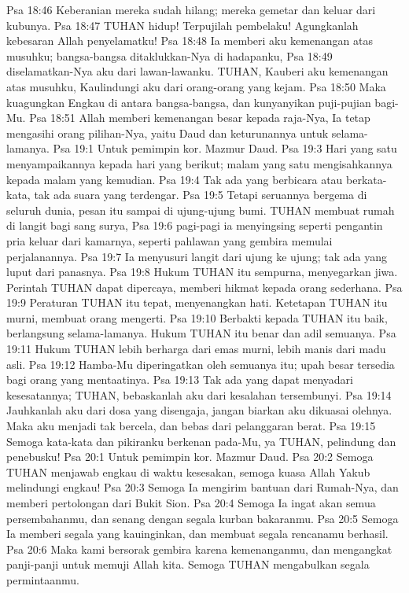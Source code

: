 Psa 18:46  Keberanian mereka sudah hilang; mereka gemetar dan keluar dari kubunya.
Psa 18:47  TUHAN hidup! Terpujilah pembelaku! Agungkanlah kebesaran Allah penyelamatku!
Psa 18:48  Ia memberi aku kemenangan atas musuhku; bangsa-bangsa ditaklukkan-Nya di hadapanku,
Psa 18:49  diselamatkan-Nya aku dari lawan-lawanku. TUHAN, Kauberi aku kemenangan atas musuhku, Kaulindungi aku dari orang-orang yang kejam.
Psa 18:50  Maka kuagungkan Engkau di antara bangsa-bangsa, dan kunyanyikan puji-pujian bagi-Mu.
Psa 18:51  Allah memberi kemenangan besar kepada raja-Nya, Ia tetap mengasihi orang pilihan-Nya, yaitu Daud dan keturunannya untuk selama-lamanya.
Psa 19:1  Untuk pemimpin kor. Mazmur Daud.
Psa 19:3  Hari yang satu menyampaikannya kepada hari yang berikut; malam yang satu mengisahkannya kepada malam yang kemudian.
Psa 19:4  Tak ada yang berbicara atau berkata-kata, tak ada suara yang terdengar.
Psa 19:5  Tetapi seruannya bergema di seluruh dunia, pesan itu sampai di ujung-ujung bumi. TUHAN membuat rumah di langit bagi sang surya,
Psa 19:6  pagi-pagi ia menyingsing seperti pengantin pria keluar dari kamarnya, seperti pahlawan yang gembira memulai perjalanannya.
Psa 19:7  Ia menyusuri langit dari ujung ke ujung; tak ada yang luput dari panasnya.
Psa 19:8  Hukum TUHAN itu sempurna, menyegarkan jiwa. Perintah TUHAN dapat dipercaya, memberi hikmat kepada orang sederhana.
Psa 19:9  Peraturan TUHAN itu tepat, menyenangkan hati. Ketetapan TUHAN itu murni, membuat orang mengerti.
Psa 19:10  Berbakti kepada TUHAN itu baik, berlangsung selama-lamanya. Hukum TUHAN itu benar dan adil semuanya.
Psa 19:11  Hukum TUHAN lebih berharga dari emas murni, lebih manis dari madu asli.
Psa 19:12  Hamba-Mu diperingatkan oleh semuanya itu; upah besar tersedia bagi orang yang mentaatinya.
Psa 19:13  Tak ada yang dapat menyadari kesesatannya; TUHAN, bebaskanlah aku dari kesalahan tersembunyi.
Psa 19:14  Jauhkanlah aku dari dosa yang disengaja, jangan biarkan aku dikuasai olehnya. Maka aku menjadi tak bercela, dan bebas dari pelanggaran berat.
Psa 19:15  Semoga kata-kata dan pikiranku berkenan pada-Mu, ya TUHAN, pelindung dan penebusku!
Psa 20:1  Untuk pemimpin kor. Mazmur Daud.
Psa 20:2  Semoga TUHAN menjawab engkau di waktu kesesakan, semoga kuasa Allah Yakub melindungi engkau!
Psa 20:3  Semoga Ia mengirim bantuan dari Rumah-Nya, dan memberi pertolongan dari Bukit Sion.
Psa 20:4  Semoga Ia ingat akan semua persembahanmu, dan senang dengan segala kurban bakaranmu.
Psa 20:5  Semoga Ia memberi segala yang kauinginkan, dan membuat segala rencanamu berhasil.
Psa 20:6  Maka kami bersorak gembira karena kemenanganmu, dan mengangkat panji-panji untuk memuji Allah kita. Semoga TUHAN mengabulkan segala permintaanmu.
